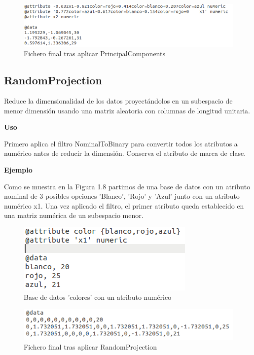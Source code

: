 	\begin{figure}[!htp]
	\centering
	\includegraphics[scale=.42]{./figuras/image12.png}
	\caption{Fichero final tras aplicar PrincipalComponents}
	\end{figure}


\newpage

	\subsection{RandomProjection}
		Reduce la dimensionalidad de los datos proyectándolos en un subespacio de menor dimensión usando una matriz aleatoria con columnas de longitud unitaria.
	

	\begin{justify}
	\textbf{Uso} 
	\end{justify}
	
		Primero aplica el filtro NominalToBinary para convertir todos los atributos a numérico antes de reducir la dimensión. Conserva el atributo de marca de clase.

	\begin{justify}
	\textbf{Ejemplo}
	\end{justify}

		Como se muestra en la Figura 1.8 partimos de una base de datos con un atributo nominal de 3 posibles opciones 'Blanco', 'Rojo' y 'Azul' junto con un atributo numérico x1.
		Una vez aplicado el filtro, el primer atributo queda establecido en una matriz numérica de un subespacio menor. 

	\begin{figure}[!htp]
	\centering
	\includegraphics[scale=.42]{./figuras/image11.png}
	\caption{Base de datos 'colores' con un atributo numérico}
	\end{figure}
	
	\begin{figure}[!htp]
	\centering
	\includegraphics[scale=.42]{./figuras/image44.png}
	\caption{Fichero final tras aplicar RandomProjection}
	\end{figure}


